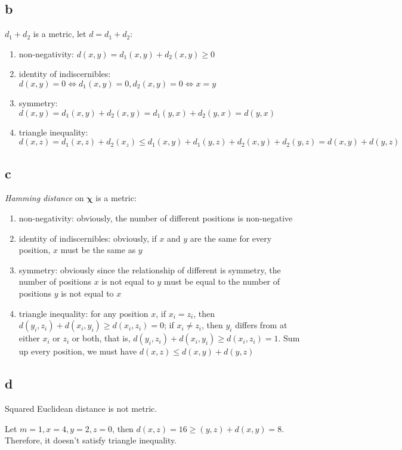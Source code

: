 \documentclass[a4paper,11pt]{article}
\theoremstyle{mytheor}
\begin{document}
\subsection*{b}
$d_1 + d_2$ is a metric, let $d = d_1 + d_2$:
\begin{enumerate}
	\item non-negativity: $d(x,y) = d_1(x,y) + d_2(x,y) \geq 0$
	\item identity of indiscernibles: $d(x,y) = 0 \Leftrightarrow d_1(x,y) = 0, d_2(x,y) = 0 \Leftrightarrow x = y$
	\item symmetry: $d(x,y) = d_1(x,y) + d_2(x,y) = d_1(y,x) + d_2(y,x) = d(y,x)$
	\item triangle inequality: $d(x,z) = d_1(x,z) + d_2(x_z) \leq d_1(x,y) + d_1(y,z) + d_2(x,y) + d_2(y,z) = d(x,y) + d(y,z) $
\end{enumerate}


\subsection*{c}
\textit{Hamming distance} on $\mathbf{\chi}$ is  a metric:
\begin{enumerate}
	\item non-negativity: obviously, the number of different positions is non-negative
	\item identity of indiscernibles: obviously, if $x$ and $y$ are the same for every position, $x$ must be the same as $y$
	\item symmetry: obviously since the relationship of different is symmetry, the number of positions $x$ is not equal to $y$ must be equal to 
	the number of positions $y$ is not equal to $x$ 
	\item triangle inequality: for any position $x$, if $x_i = z_i$, then $d(y_i,z_i) + d(x_i, y_i) \geq d(x_i, z_i) = 0$; if $x_i \neq z_i$, then
	$y_i$ differs from at either $x_i$ or $z_i$ or both, that is, $d(y_i,z_i) + d(x_i, y_i) \geq d(x_i, z_i) = 1$. Sum up every position, we must have
	$d(x,z) \leq d(x,y) + d(y,z)$
\end{enumerate}

\subsection*{d}
Squared Euclidean distance is not metric. 

Let $m = 1, x= 4, y= 2, z= 0$, then $d(x,z) = 16 \geq (y,z) + d(x,y) = 8$. Therefore, it doesn't satisfy 
triangle inequality. 
\end{document}
